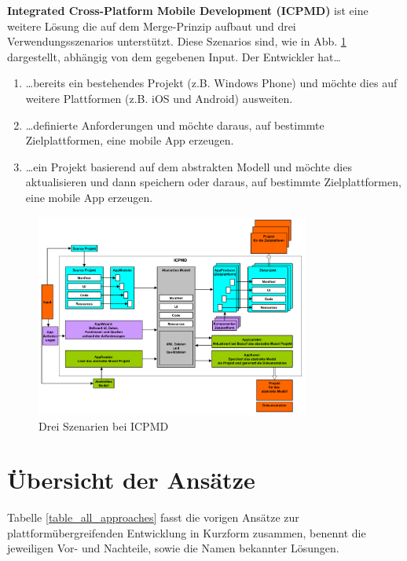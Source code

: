 \medskip
\textbf{Integrated Cross-Platform Mobile Development (ICPMD)} ist eine weitere Lösung die auf dem Merge-Prinzip aufbaut und drei Verwendungsszenarios unterstützt. Diese Szenarios sind, wie in Abb. \ref{graph_merge_integrated_based} dargestellt, abhängig von dem gegebenen Input. 
Der Entwickler hat…
 
\begin{enumerate}
	\item …bereits ein bestehendes Projekt (z.B. Windows Phone) und möchte dies auf weitere Plattformen (z.B. iOS und Android) ausweiten.
	
	\item …definierte Anforderungen und möchte daraus, auf bestimmte Zielplattformen, eine mobile App erzeugen.
	
	\item …ein Projekt basierend auf dem abstrakten Modell und möchte dies aktualisieren und dann speichern oder daraus, auf bestimmte Zielplattformen, eine mobile App erzeugen.
\end{enumerate}

\begin{figure}[htbp]
	\centering
	\includegraphics[width=0.8\textwidth]{Bilder/Merge_Integrated_based}
	\caption{Drei Szenarien bei ICPMD}\label{graph_merge_integrated_based}
\end{figure}

\section{Übersicht der Ansätze}
Tabelle \ref{table_all_approaches} fasst die vorigen Ansätze zur plattformübergreifenden Entwicklung in Kurzform zusammen, benennt die jeweiligen Vor- und Nachteile, sowie die Namen bekannter Lösungen.


